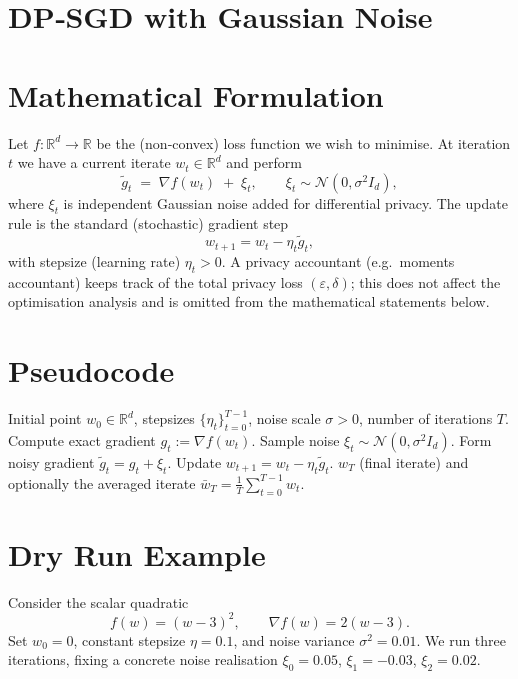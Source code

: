 \documentclass[11pt]{article}
\newcommand{\RR}{\mathbb{R}}
\begin{document}
\section*{DP‑SGD with Gaussian Noise}

\section*{Mathematical Formulation}
Let $f:\RR^{d}\to\RR$ be the (non‑convex) loss function we wish to minimise.
At iteration $t$ we have a current iterate $w_t\in\RR^{d}$ and perform
\[
\tilde g_t \;=\; \nabla f(w_t) \;+\; \xi_t ,\qquad 
\xi_t\sim\mathcal N(0,\sigma^{2} I_d) ,
\tag{1}
\]
where $\xi_t$ is independent Gaussian noise added for differential privacy.
The update rule is the standard (stochastic) gradient step
\[
w_{t+1}= w_t - \eta_t \tilde g_t ,
\tag{2}
\]
with stepsize (learning rate) $\eta_t>0$.
A privacy accountant (e.g.\ moments accountant) keeps track of the total
privacy loss $(\varepsilon,\delta)$; this does not affect the optimisation
analysis and is omitted from the mathematical statements below.

\section*{Pseudocode}
\begin{algorithm}[H]
\caption{DP‑SGD with Gaussian Noise}
\begin{algorithmic}[1]
\REQUIRE Initial point $w_0\in\RR^{d}$, stepsizes $\{\eta_t\}_{t=0}^{T-1}$,
        noise scale $\sigma>0$, number of iterations $T$.
    \STATE Compute exact gradient $g_t:=\nabla f(w_t)$.
    \STATE Sample noise $\xi_t\sim\mathcal N(0,\sigma^{2}I_d)$.
    \STATE Form noisy gradient $\tilde g_t = g_t+\xi_t$.
    \STATE Update $w_{t+1}=w_t-\eta_t\tilde g_t$.
\ENDFOR
\ENSURE $w_T$ (final iterate) and optionally the averaged iterate
        $\bar w_T=\frac1T\sum_{t=0}^{T-1}w_t$.
\end{algorithmic}
\end{algorithm}

\section*{Dry Run Example}
Consider the scalar quadratic
\[
f(w)=(w-3)^2,\qquad \nabla f(w)=2(w-3).
\]
Set $w_0=0$, constant stepsize $\eta=0.1$, and noise variance $\sigma^2=0.01$.
We run three iterations, fixing a concrete noise realisation
$\xi_0=0.05$, $\xi_1=-0.03$, $\xi_2=0.02$.
\end{document}
